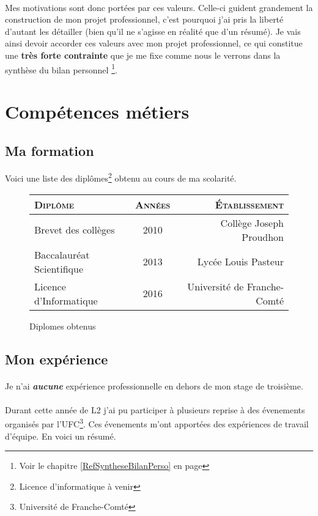 \documentclass[a4paper,12pt, draft]{report}
\newcommand{\tabTitle}[1]{\hfill{} \textsc{#1} \hfill{} }
\begin{document}
\paragraph{}
Mes motivations sont donc portées par ces valeurs. Celle-ci guident grandement la construction de mon projet professionnel, c'est pourquoi j'ai pris la liberté d'autant les détailler (bien qu'il ne s'agisse en réalité que d'un résumé).
Je vais ainsi devoir accorder ces valeurs avec mon projet professionnel, ce qui constitue une \textbf{très forte contrainte} que je me fixe comme nous le verrons dans la synthèse du bilan personnel \footnote{Voir le chapitre \ref{RefSyntheseBilanPerso} en page \pageref{RefSyntheseBilanPerso}}.

\newpage

\section{Compétences métiers}
\subsection{Ma formation}
Voici une liste des diplômes\footnote{Licence d'informatique à venir} obtenu au cours de ma scolarité.
\begin{figure}[h]
\begin{tabular}{|l|c|r|}
\hline
\tabTitle{Diplôme} & \tabTitle{Années} & \tabTitle{Établissement}\\
\hline
Brevet des collèges & 2010 & Collège Joseph Proudhon \\
\hline
Baccalauréat Scientifique & 2013 & Lycée Louis Pasteur \\
\hline
Licence d'Informatique & 2016 & Université de Franche-Comté\\
\hline
\end{tabular}
\caption{Diplomes obtenus} 
\end{figure}
\subsection{Mon expérience}
\paragraph{}
Je n'ai \textit{\textbf{aucune}} expérience professionnelle en dehors de mon stage de troisième.

\paragraph{}
Durant cette année de L2 j'ai pu participer à plusieurs reprise à des évenements organisés par l'UFC\footnote{Université de Franche-Comté}. Ces évenements m'ont apportées des expériences de travail d'équipe. En voici un résumé.
\end{document}
